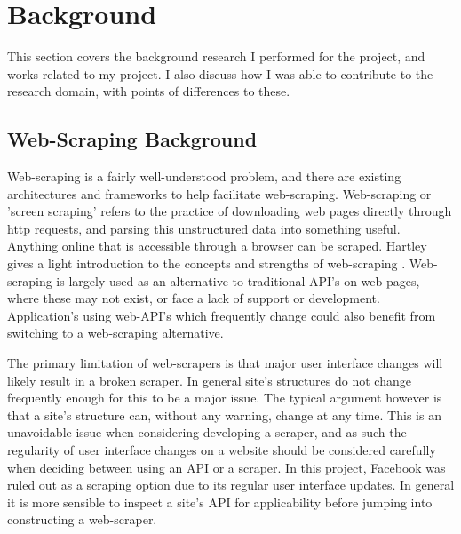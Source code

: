 \chapter{Background}\label{C:us}







This section covers the background research I performed for the project, and works related to my project. I also discuss how I was able to contribute to the research domain, with points of differences to these. 

\section{Web-Scraping Background}

Web-scraping is a fairly well-understood problem, and there are existing architectures and frameworks to help facilitate web-scraping.  Web-scraping or 'screen scraping' refers to the practice of downloading web pages directly through http requests, and parsing this unstructured data into something useful. Anything online that is accessible through a browser can be scraped. Hartley gives a light introduction to the concepts and strengths of web-scraping \cite{no_api_for_me}. Web-scraping is largely used as an alternative to traditional API's on web pages, where these may not exist, or face a lack of support or development. Application's using web-API's which frequently change could also benefit from switching to a web-scraping alternative.

The primary limitation of web-scrapers is that major user interface changes will likely result in a broken scraper. In general site's structures do not change frequently enough for this to be a major issue. The typical argument however is that a site's structure can, without any warning, change at any time. This is an unavoidable issue when considering developing a scraper, and as such the regularity of user interface changes on a website should be considered carefully when deciding between using an API or a scraper. In this project, Facebook was ruled out as a scraping option due to its regular user interface updates. In general it is more sensible to inspect a site's API for applicability before jumping into constructing a web-scraper. 

